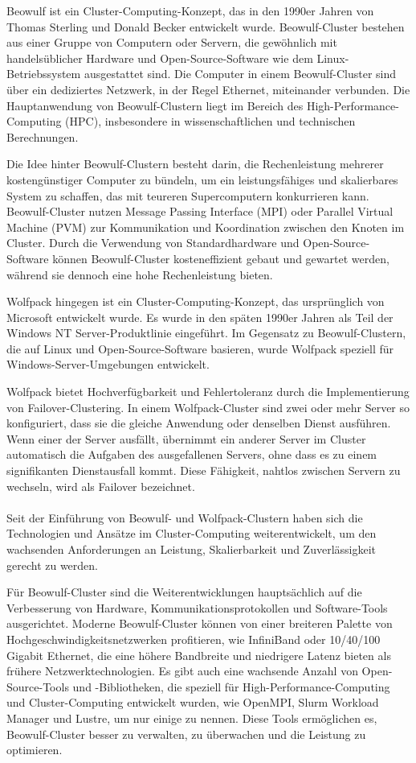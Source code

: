 Beowulf ist ein Cluster-Computing-Konzept, das in den 1990er Jahren von Thomas Sterling und Donald Becker entwickelt wurde. Beowulf-Cluster bestehen aus einer Gruppe von Computern oder Servern, die gewöhnlich mit handelsüblicher Hardware und Open-Source-Software wie dem Linux-Betriebssystem ausgestattet sind. Die Computer in einem Beowulf-Cluster sind über ein dediziertes Netzwerk, in der Regel Ethernet, miteinander verbunden. Die Hauptanwendung von Beowulf-Clustern liegt im Bereich des High-Performance-Computing (HPC), insbesondere in wissenschaftlichen und technischen Berechnungen.

Die Idee hinter Beowulf-Clustern besteht darin, die Rechenleistung mehrerer kostengünstiger Computer zu bündeln, um ein leistungsfähiges und skalierbares System zu schaffen, das mit teureren Supercomputern konkurrieren kann. Beowulf-Cluster nutzen Message Passing Interface (MPI) oder Parallel Virtual Machine (PVM) zur Kommunikation und Koordination zwischen den Knoten im Cluster. Durch die Verwendung von Standardhardware und Open-Source-Software können Beowulf-Cluster kosteneffizient gebaut und gewartet werden, während sie dennoch eine hohe Rechenleistung bieten.

Wolfpack hingegen ist ein Cluster-Computing-Konzept, das ursprünglich von Microsoft entwickelt wurde. Es wurde in den späten 1990er Jahren als Teil der Windows NT Server-Produktlinie eingeführt. Im Gegensatz zu Beowulf-Clustern, die auf Linux und Open-Source-Software basieren, wurde Wolfpack speziell für Windows-Server-Umgebungen entwickelt.

Wolfpack bietet Hochverfügbarkeit und Fehlertoleranz durch die Implementierung von Failover-Clustering. In einem Wolfpack-Cluster sind zwei oder mehr Server so konfiguriert, dass sie die gleiche Anwendung oder denselben Dienst ausführen. Wenn einer der Server ausfällt, übernimmt ein anderer Server im Cluster automatisch die Aufgaben des ausgefallenen Servers, ohne dass es zu einem signifikanten Dienstausfall kommt. Diese Fähigkeit, nahtlos zwischen Servern zu wechseln, wird als Failover bezeichnet.
\\\\
Seit der Einführung von Beowulf- und Wolfpack-Clustern haben sich die Technologien und Ansätze im Cluster-Computing weiterentwickelt, um den wachsenden Anforderungen an Leistung, Skalierbarkeit und Zuverlässigkeit gerecht zu werden.

Für Beowulf-Cluster sind die Weiterentwicklungen hauptsächlich auf die Verbesserung von Hardware, Kommunikationsprotokollen und Software-Tools ausgerichtet. Moderne Beowulf-Cluster können von einer breiteren Palette von Hochgeschwindigkeitsnetzwerken profitieren, wie InfiniBand oder 10/40/100 Gigabit Ethernet, die eine höhere Bandbreite und niedrigere Latenz bieten als frühere Netzwerktechnologien. Es gibt auch eine wachsende Anzahl von Open-Source-Tools und -Bibliotheken, die speziell für High-Performance-Computing und Cluster-Computing entwickelt wurden, wie OpenMPI, Slurm Workload Manager und Lustre, um nur einige zu nennen. Diese Tools ermöglichen es, Beowulf-Cluster besser zu verwalten, zu überwachen und die Leistung zu optimieren.

